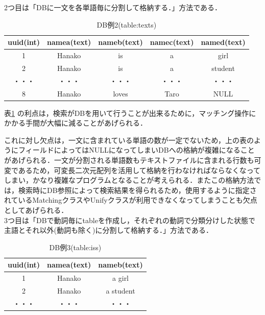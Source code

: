 \documentclass[12pt]{jarticle}
\begin{document}
2つ目は「DBに一文を各単語毎に分割して格納する．」方法である．\\


\begin{table}[htb]
  \begin{center}
    \caption{DB例2(table:texts)}
    \begin{tabular}{|c|c|c|c|c|} \hline
      uuid(int) & namea(text) & nameb(text) & namec(text) & named(text) \\ \hline \hline
      1 & Hanako & is & a & girl \\ \hline
      2 & Hanako & is & a & student \\ \hline
      ・・・ & ・・・ & ・・・ & ・・・ & ・・・ \\ \hline
	  8 & Hanako & loves & Taro & NULL \\ \hline
    \end{tabular}
    \label{tab:ex2}
  \end{center}
\end{table}

表\ref{tab:ex2} の利点は，検索がDBを用いて行うことが出来るために，マッチング操作にかかる手間が大幅に減ることがあげられる．\par
これに対し欠点は，一文に含まれている単語の数が一定でないため，上の表のようにフィールドによってはNULLになってしまいDBへの格納が複雑になることがあげられる．一文が分割される単語数もテキストファイルに含まれる行数も可変であるため，可変長二次元配列を活用して格納を行わなければならなくなってしまい，かなり複雑なプログラムとなることが考えられる．またこの格納方法では，検索時にDB参照によって検索結果を得られるため，使用するように指定されているMatchingクラスやUnifyクラスが利用できなくなってしまうことも欠点としてあげられる．\\

3つ目は「DBで動詞毎にtableを作成し，それぞれの動詞で分類分けした状態で主語とそれ以外(動詞も除く)に分割して格納する．」方法である．\\

\begin{table}[htb]
  \begin{center}
    \caption{DB例3(table:iss)}
		\begin{tabular}{|c|c|c|} \hline
	   uuid(int) & namea(text) & nameb(text) \\ \hline \hline
		  1 & Hanako & a girl \\ \hline
		  2 & Hanako & a student \\ \hline
		  ・・・ & ・・・ & ・・・ \\ \hline
	 \end{tabular}
    \label{tab:ex3}
  \end{center}
\end{table}
\end{document}
